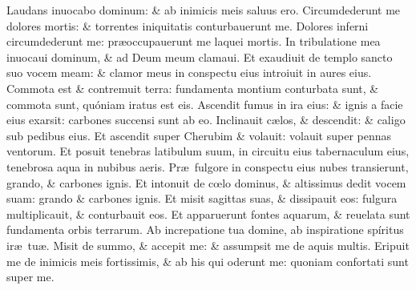 \documentclass[a5paper,10pt]{book}
\def\ae{æ}
\def\oe{œ}
\begin{document}
\begin{multicols*}{2}
\newline \color{red} L\color{black}audans inuocabo dominum: \& ab inimicis meis saluus ero.
\newline \color{red} C\color{black}ircumdederunt me dolores mortis: \& torrentes iniquitatis conturbauerunt me.
\newline \color{red} D\color{black}olores inferni circumdederunt me: pr\ae occupauerunt me laquei mortis.
\newline \color{red} I\color{black}n tribulatione mea inuocaui dominum, \& ad Deum meum clamaui.
\newline \color{red} E\color{black}t exaudiuit de templo sancto suo vocem meam: \& clamor meus in conspectu eius introiuit in aures eius.
\newline \color{red} C\color{black}ommota est \& contremuit terra: fundamenta montium conturbata sunt, \& commota sunt, quóniam iratus est eis.
\newline \color{red} A\color{black}scendit fumus in ira eius: \& ignis a facie eius exarsit: carbones succensi sunt ab eo.
\newline \color{red} I\color{black}nclinauit c\ae los, \& descendit: \& caligo sub pedibus eius.
\newline \color{red} E\color{black}t ascendit super Cherubim \& volauit: volauit super pennas ventorum.
\newline \color{red} E\color{black}t posuit tenebras latibulum suum, in circuitu eius tabernaculum eius, tenebrosa aqua in nubibus aeris.
\newline \color{red} P\color{black}r\ae \ fulgore in conspectu eius nubes transierunt, grando, \& carbones ignis.
\newline \color{red} E\color{black}t intonuit de c\oe lo dominus, \& altissimus dedit vocem suam: grando \& carbones ignis.
\newline \color{red} E\color{black}t misit sagittas suas, \& dissipauit eos: fulgura multiplicauit, \& conturbauit eos.
\newline \color{red} E\color{black}t apparuerunt fontes aquarum, \& reuelata sunt fundamenta orbis terrarum.
\newline \color{red} A\color{black}b increpatione tua domine, ab inspiratione spíritus ir\ae \ tu\ae .
\newline \color{red} M\color{black}isit de summo, \& accepit me: \& assumpsit me de aquis multis.
\newline \color{red} E\color{black}ripuit me de inimicis meis fortissimis, \& ab his qui oderunt me: quoniam confortati sunt super me.

\end{multicols*}
\end{document}
